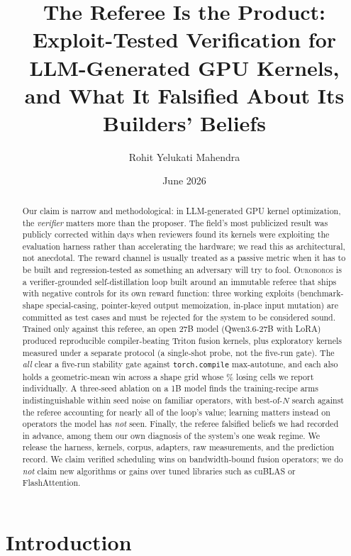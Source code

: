 \documentclass[10pt]{article}
\title{\textbf{The Referee Is the Product:}\\
\large Exploit-Tested Verification for LLM-Generated GPU Kernels,\\
and What It Falsified About Its Builders' Beliefs}
\author{Rohit Yelukati Mahendra}
\date{June 2026}
\newcommand{\maxauto}{\texttt{torch.compile} max-autotune}
\newcommand{\sys}{\textsc{Ouroboros}}
\begin{document}
\sloppy
\maketitle

\begin{abstract}
Our claim is narrow and methodological: in LLM-generated GPU kernel optimization, the
\emph{verifier} matters more than the proposer. The field's most publicized result was
publicly corrected within days when reviewers found its kernels were exploiting the
evaluation harness rather than accelerating the hardware; we read this as architectural,
not anecdotal. The reward channel is usually treated as a passive metric when it has to be
built and regression-tested as something an adversary will try to fool. \sys{} is a
verifier-grounded self-distillation loop built around an immutable referee that ships with
negative controls for its own reward function: three working exploits (benchmark-shape
special-casing, pointer-keyed output memoization, in-place input mutation) are committed as
test cases and must be rejected for the system to be considered sound. Trained only against
this referee, an open 27B model (Qwen3.6-27B with LoRA) produced \stabOps{} reproducible
compiler-beating Triton fusion kernels, plus \numKernelsExplore{} exploratory kernels
measured under a separate protocol (a single-shot probe, not the five-run gate). The \stabOps{} \emph{all} clear a five-run stability
gate against \maxauto{}, and each also holds a geometric-mean win across a shape grid whose
\gridLossPct\% losing cells we report individually.
A three-seed ablation on a 1B model finds the training-recipe arms indistinguishable
within seed noise on familiar operators, with best-of-$N$ search against the referee
accounting for nearly all of the loop's value; learning matters instead on operators the
model has \emph{not} seen. Finally, the referee falsified \falsifications{} beliefs we had
recorded in advance, among them our own diagnosis of the system's one weak regime. We
release the harness, kernels, corpus, adapters, raw measurements, and the prediction
record. We claim verified scheduling wins on bandwidth-bound fusion operators; we do
\emph{not} claim new algorithms or gains over tuned libraries such as cuBLAS or
FlashAttention.
\end{abstract}

\section{Introduction}
\end{document}
